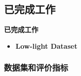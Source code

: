 \documentclass[CJK,aspectratio=169]{beamer}  %
\begin{document}
	\subsection{已完成工作}
	
	\begin{frame}
		{ \yahei \textbf{已完成工作}}
		
		\begin{itemize} 
			\item \textbf{Low-light Dataset}
		\end{itemize}
		
	\end{frame}
	
	
	\subsubsection{数据集和评价指标}
	
\end{document}
